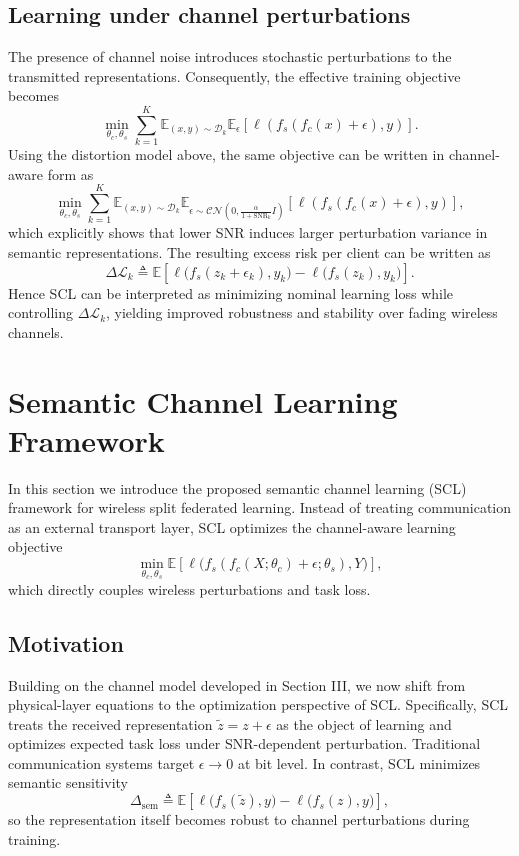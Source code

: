 \documentclass[10pt,journal]{IEEEtran}
\begin{document}
\subsection{Learning under channel perturbations}
The presence of channel noise introduces stochastic perturbations to the transmitted representations. Consequently, the effective training objective becomes
\begin{equation}
\min_{\theta_c,\theta_s}\sum_{k=1}^{K}\mathbb{E}_{(x,y)\sim \mathcal{D}_k}\mathbb{E}_{\epsilon}\left[\ell(f_s(f_c(x)+\epsilon),y)\right].
\end{equation}
Using the distortion model above, the same objective can be written in channel-aware form as
\begin{equation}
\min_{\theta_c,\theta_s}\sum_{k=1}^{K}\mathbb{E}_{(x,y)\sim \mathcal{D}_k}\mathbb{E}_{\epsilon\sim\mathcal{CN}(0,\frac{\alpha}{1+\mathrm{SNR}_k}I)}\left[\ell(f_s(f_c(x)+\epsilon),y)\right],
\end{equation}
which explicitly shows that lower SNR induces larger perturbation variance in semantic representations. The resulting excess risk per client can be written as
\begin{equation}
\Delta\mathcal{L}_k
\triangleq
\mathbb{E}\left[\ell\big(f_s(z_k+\epsilon_k),y_k\big)-\ell\big(f_s(z_k),y_k\big)\right].
\end{equation}
Hence SCL can be interpreted as minimizing nominal learning loss while controlling $\Delta\mathcal{L}_k$, yielding improved robustness and stability over fading wireless channels.
\section{Semantic Channel Learning Framework}
In this section we introduce the proposed semantic channel learning (SCL) framework for wireless split federated learning. Instead of treating communication as an external transport layer, SCL optimizes the channel-aware learning objective
\begin{equation}
\min_{\theta_c,\theta_s}\mathbb{E}\left[\ell\big(f_s(f_c(X;\theta_c)+\epsilon;\theta_s),Y\big)\right],
\end{equation}
which directly couples wireless perturbations and task loss.
\subsection{Motivation}
Building on the channel model developed in Section III, we now shift from physical-layer equations to the optimization perspective of SCL. Specifically, SCL treats the received representation $\tilde{z}=z+\epsilon$ as the object of learning and optimizes expected task loss under SNR-dependent perturbation.
Traditional communication systems target $\epsilon\to0$ at bit level. In contrast, SCL minimizes semantic sensitivity
\begin{equation}
\Delta_{\mathrm{sem}}
\triangleq
\mathbb{E}\left[\ell\big(f_s(\tilde{z}),y\big)-\ell\big(f_s(z),y\big)\right],
\end{equation}
so the representation itself becomes robust to channel perturbations during training.
\end{document}
